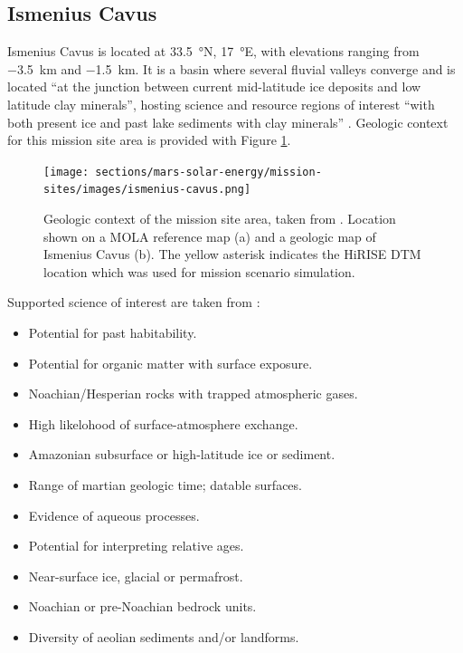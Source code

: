 \subsection{Ismenius Cavus}
\label{sec:MissionSites:IsmeniusCavus}
Ismenius Cavus is located at \SI{33.5}{\degree}N, \SI{17}{\degree}E, with elevations ranging from \SI{-3.5}{\kilo\meter} and \SI{-1.5}{\kilo\meter}. It is a basin where several fluvial valleys converge and is located ``at the junction between current mid-latitude ice deposits and low latitude clay minerals'', hosting science and resource regions of interest ``with both present ice and past lake sediments with clay minerals''  . Geologic context for this mission site area is provided with Figure \ref{fig:mission-site-ismenius-cavus}.

\begin{figure}[h]
  \centering
  \hypersetup{linkcolor=captionTextColor}
  \texttt{[image: sections/mars-solar-energy/mission-sites/images/ismenius-cavus.png]}\\
  \caption[Geologic context for Ismenius Cavus mission site area]
          {Geologic context of the mission site area, taken from . Location shown on a \ac{MOLA} reference map (a) and a geologic map of Ismenius Cavus (b). The yellow asterisk indicates the \ac{HiRISE} \ac{DTM} location which was used for mission scenario simulation.}
  \label{fig:mission-site-ismenius-cavus}
\end{figure}


Supported science of interest are taken from :
\begin{itemize}
    \item Potential for past habitability.
    \item Potential for organic matter with surface exposure.
    \item Noachian/Hesperian rocks with trapped atmospheric gases.
    \item High likelohood of surface-atmosphere exchange.
    \item Amazonian subsurface or high-latitude ice or sediment.
    \item Range of martian geologic time; datable surfaces.
    \item Evidence of aqueous processes.
    \item Potential for interpreting relative ages.
    \item Near-surface ice, glacial or permafrost.
    \item Noachian or pre-Noachian bedrock units.
    \item Diversity of aeolian sediments and/or landforms.
\end{itemize}

